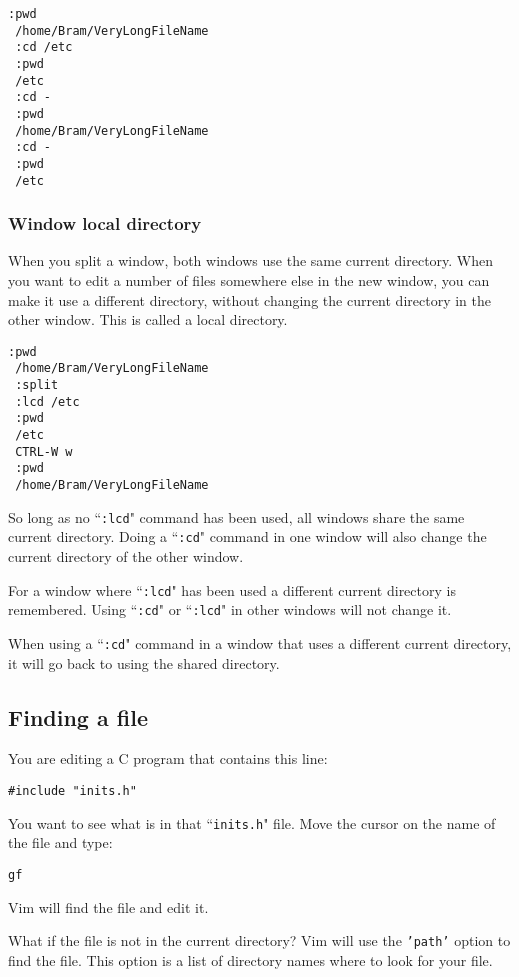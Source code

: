 \begin{Verbatim}[samepage=true]
 :pwd
 /home/Bram/VeryLongFileName
 :cd /etc
 :pwd
 /etc
 :cd -
 :pwd
 /home/Bram/VeryLongFileName
 :cd -
 :pwd
 /etc
\end{Verbatim}

\subsubsection{Window local directory}
When you split a window, both windows use the same current directory.
When you want to edit a number of files somewhere else in the new window, you can make it use a different directory, without changing the current directory in the other window.
This is called a local directory.

\begin{Verbatim}[samepage=true]
 :pwd
 /home/Bram/VeryLongFileName
 :split
 :lcd /etc
 :pwd
 /etc
 CTRL-W w
 :pwd
 /home/Bram/VeryLongFileName
\end{Verbatim}

So long as no ``\texttt{:lcd}" command has been used, all windows share the same current directory.
Doing a ``\texttt{:cd}" command in one window will also change the current directory of the other window.

For a window where ``\texttt{:lcd}" has been used a different current directory is remembered.
Using ``\texttt{:cd}" or ``\texttt{:lcd}" in other windows will not change it.

When using a ``\texttt{:cd}" command in a window that uses a different current directory, it will go back to using the shared directory.
\subsection{Finding a file}
You are editing a C program that contains this line:

\begin{Verbatim}[samepage=true]
    #include "inits.h"
\end{Verbatim}

You want to see what is in that ``\texttt{inits.h}" file.
Move the cursor on the name of the file and type:

\begin{Verbatim}[samepage=true]
 gf
\end{Verbatim}

Vim will find the file and edit it.

What if the file is not in the current directory?  Vim will use the \texttt{'path'} option to find the file.
This option is a list of directory names where to look for your file.

